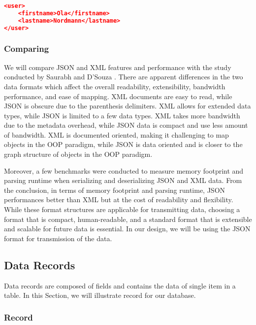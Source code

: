 \begin{lstlisting}[language=json, caption={My Caption}, captionpos=b]
<user>
    <firstname>Ola</firstname>
    <lastname>Nordmann</lastname>
</user>
\end{lstlisting}

\subsubsection{Comparing}
We will compare JSON and XML features and performance with the study conducted by Saurabh and D’Souza \cite{jsonvxml}. There are apparent differences in the two data formats which affect the overall readability, extensibility, bandwidth performance, and ease of mapping. XML documents are easy to read, while JSON is obscure due to the parenthesis delimiters. XML allows for extended data types, while JSON is limited to a few data types. XML takes more bandwidth due to the metadata overhead, while JSON data is compact and use less amount of bandwidth. XML is documented oriented, making it challenging to map objects in the OOP paradigm, while JSON is data oriented and is closer to the graph structure of objects in the OOP paradigm.

Moreover, a few benchmarks were conducted to measure memory footprint and parsing runtime when serializing and deserializing JSON and XML data. From the conclusion,  in terms of memory footprint and parsing runtime, JSON performances better than XML but at the cost of readability and flexibility. While these format structures are applicable for transmitting data, choosing a format that is compact, human-readable, and a standard format that is extensible and scalable for future data is essential. In our design, we will be using the JSON format for transmission of the data.

\subsection{Data Records}
Data records are composed of fields and contains the data of single item in a table. In this Section, we will illustrate record for our database.

\subsubsection{Record}


\begin{table}
\begin{center}
\caption{Example entry in record table}
\end{center}
\end{table}


